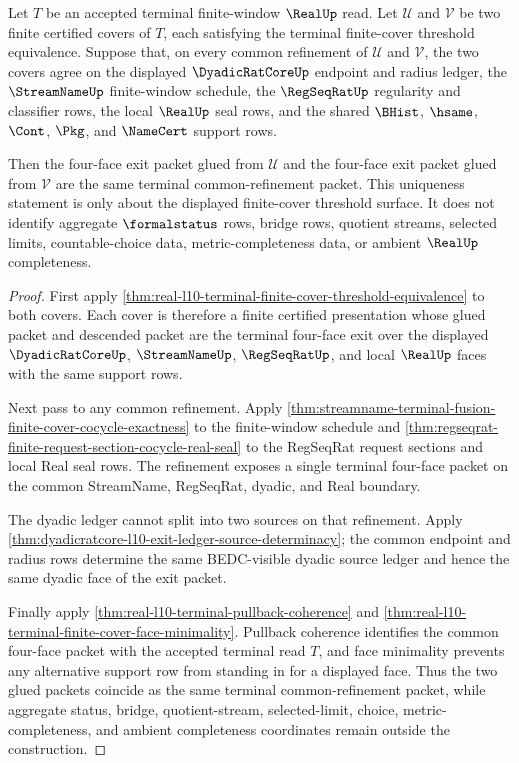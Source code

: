\begin{theorem}
\label{thm:real-l10-finite-cover-threshold-cocycle-uniqueness}
Let $T$ be an accepted terminal finite-window $\RealUp$ read. Let
$\mathcal U$ and $\mathcal V$ be two finite certified covers of $T$, each
satisfying the terminal finite-cover threshold equivalence. Suppose that, on
every common refinement of $\mathcal U$ and $\mathcal V$, the two covers agree
on the displayed $\DyadicRatCoreUp$ endpoint and radius ledger, the
$\StreamNameUp$ finite-window schedule, the $\RegSeqRatUp$ regularity and
classifier rows, the local $\RealUp$ seal rows, and the shared $\BHist$,
$\hsame$, $\Cont$, $\Pkg$, and $\NameCert$ support rows.

Then the four-face exit packet glued from $\mathcal U$ and the four-face exit
packet glued from $\mathcal V$ are the same terminal common-refinement packet.
This uniqueness statement is only about the displayed finite-cover threshold
surface. It does not identify aggregate $\formalstatus$ rows, bridge rows,
quotient streams, selected limits, countable-choice data,
metric-completeness data, or ambient $\RealUp$ completeness.
\end{theorem}
\begin{proof}
First apply
\autoref{thm:real-l10-terminal-finite-cover-threshold-equivalence} to both
covers. Each cover is therefore a finite certified presentation whose glued
packet and descended packet are the terminal four-face exit over the displayed
$\DyadicRatCoreUp$, $\StreamNameUp$, $\RegSeqRatUp$, and local $\RealUp$
faces with the same support rows.

Next pass to any common refinement. Apply
\autoref{thm:streamname-terminal-fusion-finite-cover-cocycle-exactness} to the
finite-window schedule and
\autoref{thm:regseqrat-finite-request-section-cocycle-real-seal} to the
RegSeqRat request sections and local Real seal rows. The refinement exposes a
single terminal four-face packet on the common StreamName, RegSeqRat, dyadic,
and Real boundary.

The dyadic ledger cannot split into two sources on that refinement. Apply
\autoref{thm:dyadicratcore-l10-exit-ledger-source-determinacy}; the common
endpoint and radius rows determine the same BEDC-visible dyadic source ledger
and hence the same dyadic face of the exit packet.

Finally apply \autoref{thm:real-l10-terminal-pullback-coherence} and
\autoref{thm:real-l10-terminal-finite-cover-face-minimality}. Pullback
coherence identifies the common four-face packet with the accepted terminal
read $T$, and face minimality prevents any alternative support row from
standing in for a displayed face. Thus the two glued packets coincide as the
same terminal common-refinement packet, while aggregate status, bridge,
quotient-stream, selected-limit, choice, metric-completeness, and ambient
completeness coordinates remain outside the construction.
\end{proof}


